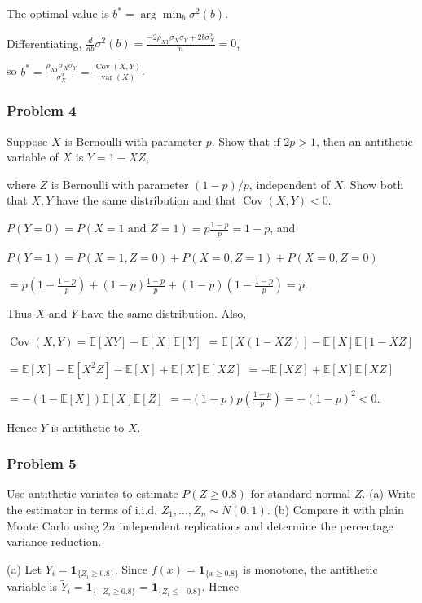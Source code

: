 The optimal value is
$b^*=\arg\min_b\sigma^2(b)$.

Differentiating,
$\frac{d}{db}\sigma^2(b)=\frac{-2\rho_{XY}\sigma_X\sigma_Y+2b\sigma_X^2}{n}=0$,

so
$b^*=\frac{\rho_{XY}\sigma_X\sigma_Y}{\sigma_X^2}=\frac{\operatorname{Cov}(X,Y)}{\operatorname{var}(X)}$.

\subsubsection*{Problem 4}

 Suppose $X$ is Bernoulli with parameter $p$. Show that if $2p>1$, then an antithetic variable of $X$ is
$Y=1-XZ$,

where $Z$ is Bernoulli with parameter $(1-p)/p$, independent of $X$. Show both that $X,Y$ have the same distribution and that $\operatorname{Cov}(X,Y)<0$.


$P(Y=0)=P(X=1\text{ and }Z=1)=p\frac{1-p}{p}=1-p$,
and

$P(Y=1)=P(X=1,Z=0)+P(X=0,Z=1)+P(X=0,Z=0)$

$=p\left(1-\frac{1-p}{p}\right)+(1-p)\frac{1-p}{p}+(1-p)\left(1-\frac{1-p}{p}\right)=p$.

Thus $X$ and $Y$ have the same distribution. Also,

$\operatorname{Cov}(X,Y)=\mathbb{E}[XY]-\mathbb{E}[X]\mathbb{E}[Y]$
$=\mathbb{E}[X(1-XZ)]-\mathbb{E}[X]\mathbb{E}[1-XZ]$

$=\mathbb{E}[X]-\mathbb{E}[X^2Z]-\mathbb{E}[X]+\mathbb{E}[X]\mathbb{E}[XZ]$
$=-\mathbb{E}[XZ]+\mathbb{E}[X]\mathbb{E}[XZ]$

$=-(1-\mathbb{E}[X])\mathbb{E}[X]\mathbb{E}[Z]$
$=-\left(1-p\right)p\left(\frac{1-p}{p}\right)=-(1-p)^2<0$.

Hence $Y$ is antithetic to $X$.

\subsubsection*{Problem 5}

 Use antithetic variates to estimate $P(Z\geq0.8)$ for standard normal $Z$. (a) Write the estimator in terms of i.i.d. $Z_1,\ldots,Z_n\sim N(0,1)$. (b) Compare it with plain Monte Carlo using $2n$ independent replications and determine the percentage variance reduction.

 (a) Let $Y_i=\mathbf1_{\{Z_i\geq0.8\}}$. Since $f(x)=\mathbf1_{\{x\geq0.8\}}$ is monotone, the antithetic variable is $\widetilde Y_i=\mathbf1_{\{-Z_i\geq0.8\}}=\mathbf1_{\{Z_i\leq-0.8\}}$. Hence

